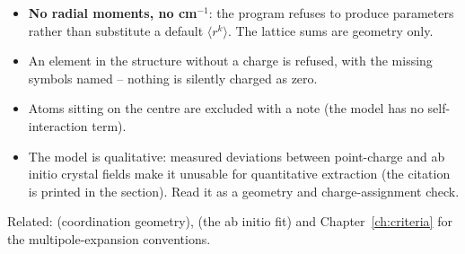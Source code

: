 \begin{refusalbox}
\begin{itemize}
  \item \textbf{No radial moments, no cm$^{-1}$}: the program refuses to
    produce parameters rather than substitute a default $\langle r^k\rangle$.
    The lattice sums are geometry only.
  \item An element in the structure without a charge is refused, with the
    missing symbols named -- nothing is silently charged as zero.
  \item Atoms sitting on the centre are excluded with a note (the model has no
    self-interaction term).
  \item The model is qualitative: measured deviations between point-charge and
    ab initio crystal fields make it unusable for quantitative extraction
    (the citation is printed in the section). Read it as a geometry and
    charge-assignment check.
\end{itemize}
\end{refusalbox}

Related:  (coordination geometry),  (the ab initio fit) and
Chapter~\ref{ch:criteria} for the multipole-expansion conventions.

